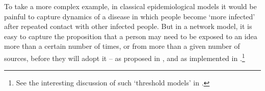 To take a more complex example, in classical epidemiological models it would be painful to capture dynamics of a disease in which people become  `more infected' after repeated contact with other infected people.  But in a network model, it is easy to capture the proposition that a person may need to be exposed to an idea more than a certain number of times, or from more than a given number of sources, before they will adopt it -- as proposed in \cite{granovetter1978threshold}, and as implemented in \cite{jackson2007diffusion}.\footnote{See the interesting discussion of such `threshold models' in \cite{glasserman2016contagion}.}




